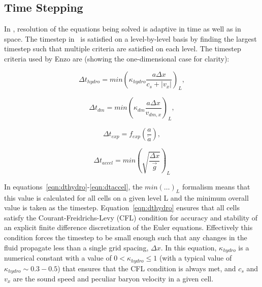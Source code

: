 
\subsection{Time Stepping}\label{sec.timestepping}
In \enzo, resolution of the equations being solved is adaptive in time 
as well as in space.  The timestep in \enzo\ is satisfied on a level-by-level
 basis by finding the largest timestep such that multiple criteria are
satisfied on each level.  The timestep criteria used by Enzo are 
(showing the one-dimensional case for clarity):

\begin{equation}
\Delta t_{hydro} = min \left( \kappa_{hydro} \frac{a \Delta x}{c_{s} + |v_x|} \right)_L ,
\label{eqn:dthydro}
\end{equation}

\begin{equation}
\Delta t_{dm} = min \left(\kappa_{dm} \frac{a \Delta x}{v_{dm,x}} \right)_L ,
\label{eqn:dtdarkmatter}
\end{equation}

\begin{equation}
\Delta t_{exp} = f_{exp} \left( \frac{a}{\dot{a}} \right) ,
\label{eqn:dtexpand}
\end{equation}

\begin{equation}
\Delta t_{accel} = min \left( \sqrt{\frac{\Delta x}{\vec{g}}} \right)_L 
\label{eqn:dtaccel}
\end{equation}

 In equations~\ref{eqn:dthydro}-\ref{eqn:dtaccel}, the $min ( \ldots )_L$
formalism means that this value is calculated for all cells on a given level
L and the minimum overall value is taken as the timestep.  
Equation~\ref{eqn:dthydro} ensures that all cells satisfy the 
Courant-Freidrichs-Levy (CFL) condition for accuracy and stability of an explicit
finite difference discretization of the Euler equations.  Effectively this condition
forces the timestep to be small enough such that any changes in the fluid propagate
less than a single grid spacing, $\Delta x$.  In this equation, $\kappa_{hydro}$ is 
a numerical constant with a value of $0 < \kappa_{hydro} \leq 1$ (with a typical
value of $\kappa_{hydro} \sim 0.3-0.5$) that ensures that the CFL condition is always
met, and $c_s$ and $v_x$ are the sound speed and peculiar baryon
velocity in a given cell.

